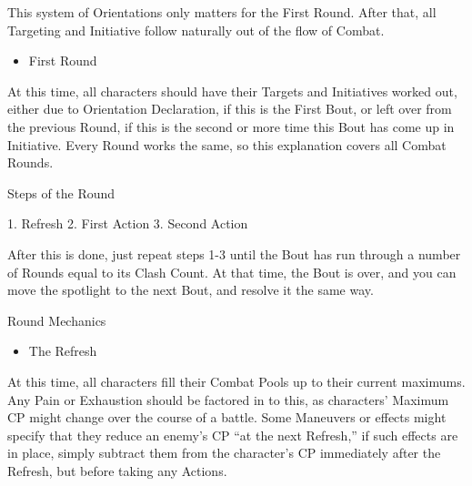\documentclass[oneside,11pt,english]{book}
\begin{document}
This system of Orientations only matters for the First Round. After that, all Targeting and 
Initiative follow naturally out of the flow of Combat. 

 
\begin{itemize}
\item First Round 
\end{itemize}
 

At this time, all characters should have their Targets and Initiatives worked out, either due to 
Orientation Declaration, if this is the First Bout, or left over from the previous Round, if this is 
the second or more time this Bout has come up in Initiative. Every Round works the same, so 
this explanation covers all Combat Rounds. 

 

Steps of the Round 

 

1. Refresh 
2. First Action 
3. Second Action 

 

After this is done, just repeat steps 1-3 until the Bout has run through a number of Rounds equal to its 
Clash Count. At that time, the Bout is over, and you can move the spotlight to the next Bout, and resolve 
it the same way. 


 

 

Round Mechanics 

 
\begin{itemize}
\item The Refresh 
\end{itemize}
At this time, all characters fill their Combat Pools up to their current maximums. Any Pain or Exhaustion 
should be factored in to this, as characters’ Maximum CP might change over the course of a battle. Some 
Maneuvers or effects might specify that they reduce an enemy’s CP “at the next Refresh,” if such effects 
are in place, simply subtract them from the character’s CP immediately after the Refresh, but before 
taking any Actions. 
\end{document}
